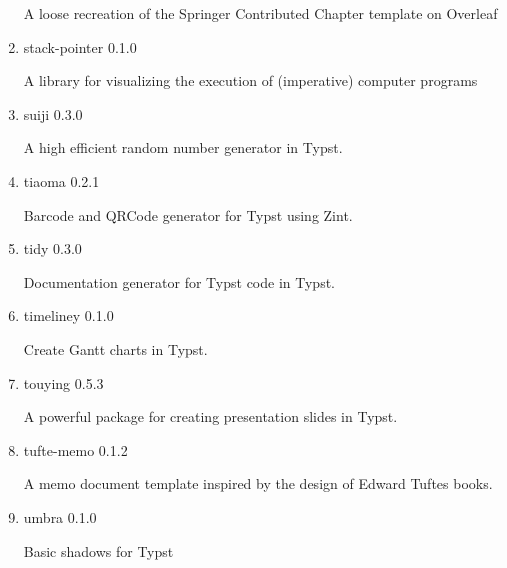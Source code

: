 \begin{enumerate}
  A loose recreation of the Springer Contributed Chapter template on
  Overleaf

  { }
\item
  \href{/universe/package/stack-pointer/}{}

  { stack-pointer } { 0.1.0 }

  A library for visualizing the execution of (imperative) computer
  programs

  { }
\item
  \href{/universe/package/suiji/}{}

  { suiji } { 0.3.0 }

  A high efficient random number generator in Typst.

  { }
\item
  \href{/universe/package/tiaoma/}{}

  { tiaoma } { 0.2.1 }

  Barcode and QRCode generator for Typst using Zint.

  { }
\item
  \href{/universe/package/tidy/}{}

  { tidy } { 0.3.0 }

  Documentation generator for Typst code in Typst.

  { }
\item
  \href{/universe/package/timeliney/}{}

  { timeliney } { 0.1.0 }

  Create Gantt charts in Typst.

  { }
\item
  \href{/universe/package/touying/}{}

  { touying } { 0.5.3 }

  A powerful package for creating presentation slides in Typst.

  { }
\item
  \href{/universe/package/tufte-memo/}{}


  { tufte-memo } { 0.1.2 }

  A memo document template inspired by the design of Edward
  Tufte\textquotesingle s books.

  { }
\item
  \href{/universe/package/umbra/}{}

  { umbra } { 0.1.0 }

  Basic shadows for Typst


\end{enumerate}
